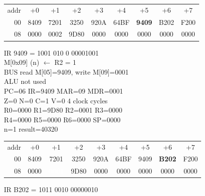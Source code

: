 \begin{tcolorbox}[stepbox, title={Step 35 \hfill PC 04 \quad ADDI R2, R2, -1}]
{\begin{tabular}{@{}r*{8}{c}@{}}
\textcolor{dim}{addr} & \textcolor{dim}{+0} & \textcolor{dim}{+1} & \textcolor{dim}{+2} & \textcolor{dim}{+3} & \textcolor{dim}{+4} & \textcolor{dim}{+5} & \textcolor{dim}{+6} & \textcolor{dim}{+7}\\
\textcolor{dim}{00} & 8409 & 7201 & 3250 & 920A & 64BF & \cellcolor{pcc}\textbf{9409} & B202 & F200\\
\textcolor{dim}{08} & 0000 & \cellcolor{datac}0002 & \cellcolor{datac}9D80 & 0000 & 0000 & 0000 & 0000 & 0000\\
\end{tabular}}
\end{tcolorbox}\par\vspace{3pt}
\noindent\begin{tcolorbox}[stepbox, title={Step 36 \hfill PC 05 \quad ST R2, n}]
\textcolor{dim}{IR} 9409 = 1001 010 0 00001001\\
M[0x09] (n) $\leftarrow$ R2 = 1\\
\textcolor{dim}{BUS} read M[05]=9409, \textcolor{wrt}{write M[09]=0001}\\
\textcolor{dim}{ALU} \textcolor{dim}{not used}\\
PC=06 IR=9409 MAR=09 MDR=0001\\
Z=0 N=0 C=1 V=0 \hfill \textcolor{dim}{4 clock cycles}\\
R0=0000 R1=9D80 R2=0001 R3=0000\\
R4=0000 R5=0000 R6=0000 SP=0000\\
\textcolor{dim}{n=1  result=40320}\\[1pt]
{\setlength{\tabcolsep}{1.6pt}\begin{tabular}{@{}r*{8}{c}@{}}
\textcolor{dim}{addr} & \textcolor{dim}{+0} & \textcolor{dim}{+1} & \textcolor{dim}{+2} & \textcolor{dim}{+3} & \textcolor{dim}{+4} & \textcolor{dim}{+5} & \textcolor{dim}{+6} & \textcolor{dim}{+7}\\
\textcolor{dim}{00} & 8409 & 7201 & 3250 & 920A & 64BF & 9409 & \cellcolor{pcc}\textbf{B202} & F200\\
\textcolor{dim}{08} & 0000 & \cellcolor{wrt}\textcolor{white}{\textbf{0001}} & \cellcolor{datac}9D80 & 0000 & 0000 & 0000 & 0000 & 0000\\
\end{tabular}}
\end{tcolorbox}\hfill\begin{tcolorbox}[stepbox, title={Step 37 \hfill PC 06 \quad BNE loop}]
\textcolor{dim}{IR} B202 = 1011 0010 00000010\\

\end{tcolorbox}
